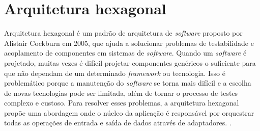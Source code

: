 






\section{Arquitetura hexagonal}
\label{sec:arquiteturaHexagonal}

Arquitetura hexagonal é um padrão de arquitetura de \textit{software} proposto por Alistair Cockburn em 2005, que ajuda a solucionar problemas de testabilidade e acoplamento de componentes em sistemas de \textit{software}. Quando um \textit{software} é projetado, muitas vezes é difícil projetar componentes genéricos o suficiente para que não dependam de um determinado \textit{framework} ou tecnologia. Isso é problemático porque a manutenção do \textit{software} se torna mais difícil e a escolha de novas tecnologias pode ser limitada, além de tornar o processo de testes complexo e custoso. Para resolver esses problemas, a arquitetura hexagonal propõe uma abordagem onde o núcleo da aplicação é responsável por orquestrar todas as operações de entrada e saída de dados através de adaptadores. \citep{cockburn2017}.

